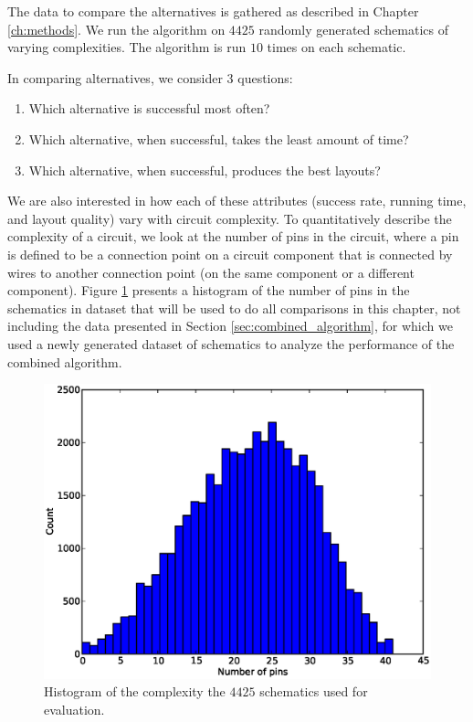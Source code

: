 The data to compare the alternatives is gathered as described in Chapter
\ref{ch:methods}. We run the algorithm on $4425$ randomly generated schematics
of varying complexities. The algorithm is run $10$ times on each schematic.

In comparing alternatives, we consider $3$ questions:
\begin{enumerate}
\item Which alternative is successful most often?
\item Which alternative, when successful, takes the least amount of time?
\item Which alternative, when successful, produces the best layouts?
\end{enumerate}

We are also interested in how each of these attributes (success rate, running
time, and layout quality) vary with circuit complexity. To quantitatively
describe the complexity of a circuit, we look at the number of pins in the
circuit, where a pin is defined to be a connection point on a circuit
component that is connected by wires to another connection point (on the same
component or a different component). Figure
\ref{fig:complexity_hist} presents a histogram of the number of pins in the
schematics in dataset that will be used to do all comparisons in this chapter,
not including the data presented in Section \ref{sec:combined_algorithm}, for
which we used a newly generated dataset of schematics to analyze the performance
of the combined algorithm.

\begin{figure}[H]
\begin{center}
\includegraphics[width=\textwidth]{Images/complexity_hist.eps}
\caption{Histogram of the complexity the $4425$ schematics used for evaluation.}
\label{fig:complexity_hist}
\end{center}
\end{figure}

